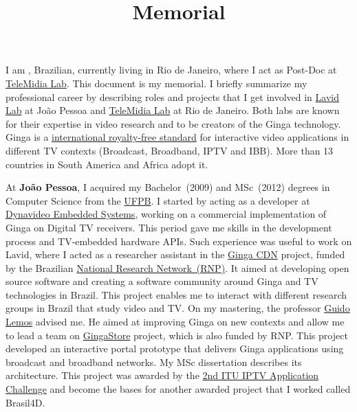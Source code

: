 \documentclass[10pt,a4paper,sans,colorlinks]{moderncv}
\title{Memorial}
\begin{document}
\hfHyperrefSetupBlueLinks
\makecvtitle

\setlength{\parindent}{15pt}
I am \myname, Brazilian, currently living in Rio de Janeiro, where I act as Post-Doc at \href{http://telemidia.puc-rio.br/}{TeleMidia Lab}.
This document is my memorial.
I briefly summarize my professional career by describing roles and projects that I get involved in \href{http://www.lavid.ufpb.br}{Lavid Lab} at João Pessoa and \href{http://telemidia.puc-rio.br/}{TeleMidia Lab} at Rio de Janeiro.
Both labs are known for their expertise in video research and to be creators of the Ginga technology.
Ginga is a \href{https://www.itu.int/rec/T-REC-H.761}{international royalty-free standard} for interactive video applications in different TV contexts (Broadcast, Broadband, IPTV and IBB).
More than 13 countries in South America and Africa adopt it.

At \textbf{João Pessoa}, I acquired my Bachelor~(2009) and MSc~(2012) degrees in Computer Science from the \href{http://www.ufpb.br}{UFPB}.
I started by acting as a developer at \href{https://www.dynavideo.com.br}{Dynavideo Embedded Systems}, working on a commercial implementation of Ginga on Digital TV receivers.
This period gave me skills in the development process and TV-embedded hardware APIs.
Such experience was useful to work on Lavid, where I acted as a researcher assistant in
the \href{http://www.redetic.rnp.br/ctic/2019/01/29/gingarap-gingafrevo/}{Ginga CDN}
project, funded by the Brazilian \href{https://www.rnp.br}{ National Research Network~(RNP)}.
It aimed at developing open source software and creating a software community around Ginga and TV technologies in Brazil.
This project enables me to interact with different research groups in Brazil that study video and TV.
On my mastering, the professor \href{https://www.linkedin.com/in/guido-lemos-5361a48/?originalSubdomain=br}{Guido Lemos} advised me.
He aimed at improving Ginga on new contexts and allow me to lead a team on \href{http://www.redetic.rnp.br/ctic/2019/01/29/ginga-appstore/}{GingaStore} project, which is also funded by RNP.
This project developed an interactive portal prototype that delivers Ginga applications using broadcast and broadband networks.
My MSc dissertation describes its architecture.
This project was awarded by the \href{http://itu.int/en/ITU-T/challenges/pages/iptv.aspx}{2nd ITU IPTV Application Challenge} and become the bases for another awarded project that I worked called Brasil4D.
\end{document}
